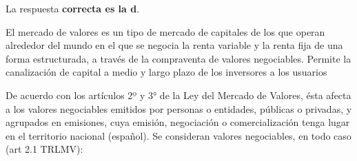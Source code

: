\documentclass[
  letterpaper,
  DIV=11,
  numbers=noendperiod]{scrreprt}
\begin{document}
\begin{tcolorbox}[enhanced jigsaw, left=2mm, opacityback=0, colback=white, breakable, arc=.35mm, bottomrule=.15mm, rightrule=.15mm, toprule=.15mm, leftrule=.75mm, colframe=quarto-callout-tip-color-frame]
\begin{minipage}[t]{5.5mm}
\textcolor{quarto-callout-tip-color}{\faLightbulb}
\end{minipage}%
\begin{minipage}[t]{\textwidth - 5.5mm}

La respuesta \textbf{correcta es la d}.

El mercado de valores es un tipo de mercado de capitales de los que
operan alrededor del mundo en el que se negocia la renta variable y la
renta fija de una forma estructurada, a través de la compraventa de
valores negociables. Permite la canalización de capital a medio y largo
plazo de los inversores a los usuarios

De acuerdo con los artículos 2º y 3° de la Ley del Mercado de Valores,
ésta afecta a los valores negociables emitidos por personas o entidades,
públicas o privadas, y agrupados en emisiones, cuya emisión, negociación
o comercialización tenga lugar en el territorio nacional (español). Se
consideran valores negociables, en todo caso (art 2.1 TRLMV):


\end{minipage}
\end{tcolorbox}
\end{document}
